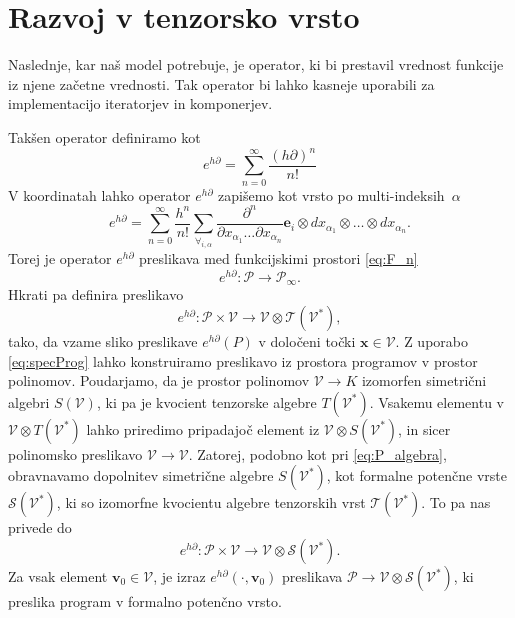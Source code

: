 \documentclass[a4paper, 12pt]{book}
\newcommand{\ed}{e^{h\partial}}
\newcommand{\Ss}{\mathcal{S}}
\newcommand{\T}{\mathcal{T}}
\newcommand{\VV}{\mathcal{V}}
\newcommand{\e}{\mathbf{e}}
\newcommand{\x}{\mathbf{x}}
\newcommand{\vv}{\mathbf{v}}
\newcommand{\dP}{\mathcal{P}}
\newcommand{\D}{\partial}
\begin{document}
\section{Razvoj v tenzorsko vrsto}\label{sec:vrsta}

Naslednje, kar naš model potrebuje, je operator, ki bi prestavil vrednost funkcije iz njene začetne vrednosti. Tak operator bi lahko kasneje uporabili za implementacijo iteratorjev in komponerjev.

Takšen operator definiramo kot
\begin{equation*}
 	e^{h\D}=\sum\limits_{n=0}^{\infty}\frac{(h\D)^n}{n!}
 \end{equation*}
V koordinatah lahko operator $e^{h\D}$ zapišemo kot vrsto po \mbox{multi-indeksih $\alpha$}
\begin{equation}\label{eq:e^d}
 	e^{h\D}=\sum\limits_{n=0}^{\infty}\frac{h^n}{n!}\sum_{\forall_{i,\alpha}}\frac{\partial^n}{\partial
 		    x_{\alpha_1}\ldots \partial x_{\alpha_n}}\e_i\otimes
 		  dx_{\alpha_1}\otimes\ldots \otimes dx_{\alpha_n}.
 \end{equation}
Torej je operator $e^{h\D}$ preslikava med funkcijskimi prostori \eqref{eq:F_n}
 \begin{equation*}
 	e^{h\D}:\dP\to\dP_\infty.
 \end{equation*}
Hkrati pa definira preslikavo
  \begin{equation}\label{eq:specProg}
  	e^{h\D}:\dP\times \VV\to \VV\otimes \T(\VV^*),
  \end{equation}
tako, da vzame sliko preslikave $\ed(P)$ v določeni točki $\x\in\VV$. Z uporabo \eqref{eq:specProg} lahko konstruiramo preslikavo iz prostora programov v prostor polinomov. Poudarjamo, da je prostor polinomov $\VV\to K$ izomorfen simetrični algebri $S(\VV)$, ki pa je kvocient tenzorske algebre $T(\VV^*)$. Vsakemu elementu v $\VV\otimes T(\VV^*)$ lahko priredimo pripadajoč element iz $\VV\otimes S(\VV^*)$, in sicer polinomsko preslikavo $\VV\to\VV$. Zatorej, podobno kot pri \eqref{eq:P_algebra}, obravnavamo dopolnitev simetrične algebre $S(\VV^*)$, kot formalne potenčne vrste $\Ss(\VV^ *)$, ki so izomorfne kvocientu algebre tenzorskih vrst $\T(\VV^ *)$. To pa nas privede do
\begin{equation}\label{eq:pToPol}
 	e^{h\D}: \dP\times \VV\to \VV\otimes \Ss(\VV^*).
 \end{equation}
Za vsak element $\vv_0\in\VV$, je izraz $\ed(\cdot,\vv_0)$ preslikava $\dP\to\VV\otimes\Ss(\VV^ *)$, ki preslika program v formalno potenčno vrsto.
\end{document}
